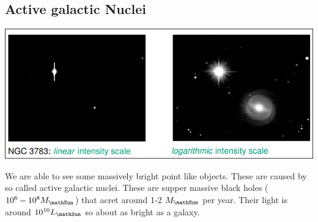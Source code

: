 \documentclass[11pt,a4paper]{article}
\begin{document}
\subsection{Active galactic Nuclei}
\begin{center}
    \includegraphics[width=0.8\linewidth]{screenshot_2024-01-26-145556.png}
\end{center}
We are able to see some massively bright point like objects.
These are caused by so called active galactic nuclei. These are supper massive black holes ($10^6-10^8 M_\mathSun$) that acret around 1-2 $M_\mathSun$ per year.
Their light is around $10^{10} L_\mathSun$ so about as bright as a galaxy.
\end{document}
